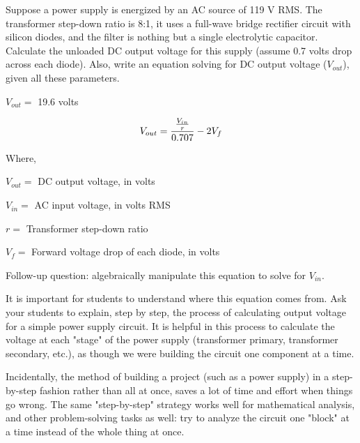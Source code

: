 

Suppose a power supply is energized by an AC source of 119 V RMS.  The transformer step-down ratio is 8:1, it uses a full-wave bridge rectifier circuit with silicon diodes, and the filter is nothing but a single electrolytic capacitor.  Calculate the unloaded DC output voltage for this supply (assume 0.7 volts drop across each diode).  Also, write an equation solving for DC output voltage ($V_{out}$), given all these parameters.







$V_{out} =$ 19.6 volts

\vskip 10pt

$$V_{out} = {{V_{in} \over r} \over 0.707} - 2 V_f$$

\noindent
Where,

$V_{out} =$ DC output voltage, in volts

$V_{in} =$ AC input voltage, in volts RMS

$r =$ Transformer step-down ratio

$V_f =$ Forward voltage drop of each diode, in volts

\vskip 10pt

Follow-up question: algebraically manipulate this equation to solve for $V_{in}$.







It is important for students to understand where this equation comes from.  Ask your students to explain, step by step, the process of calculating output voltage for a simple power supply circuit.  It is helpful in this process to calculate the voltage at each "stage" of the power supply (transformer primary, transformer secondary, etc.), as though we were building the circuit one component at a time.

Incidentally, the method of building a project (such as a power supply) in a step-by-step fashion rather than all at once, saves a lot of time and effort when things go wrong.  The same "step-by-step" strategy works well for mathematical analysis, and other problem-solving tasks as well: try to analyze the circuit one "block" at a time instead of the whole thing at once.




